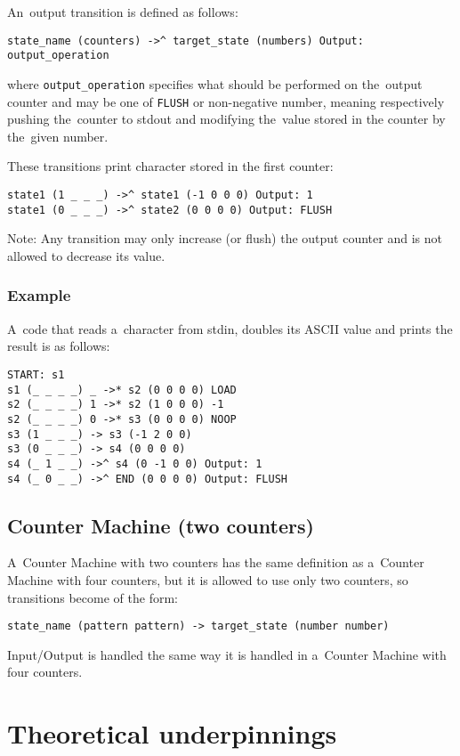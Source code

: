\documentclass[english,shortabstract,mgr]{iithesis}
\begin{document}
An~output transition is defined as follows:
\begin{verbatim}
state_name (counters) ->^ target_state (numbers) Output: output_operation
\end{verbatim}
%
where \texttt{output\_operation} specifies what should be performed on the~output
counter and may be one of \texttt{FLUSH} or non-negative number, meaning
respectively pushing the~counter to stdout and modifying the~value stored
in the counter by the~given number.

These transitions print character stored in the first counter:
\begin{verbatim}
state1 (1 _ _ _) ->^ state1 (-1 0 0 0) Output: 1
state1 (0 _ _ _) ->^ state2 (0 0 0 0) Output: FLUSH
\end{verbatim}

Note: Any transition may only increase (or flush) the output counter
and is not allowed to decrease its value.

\subsection{Example}

A~code that reads a~character from stdin, doubles its ASCII value and prints
the result is as follows:
\begin{verbatim}
START: s1
s1 (_ _ _ _) _ ->* s2 (0 0 0 0) LOAD
s2 (_ _ _ _) 1 ->* s2 (1 0 0 0) -1
s2 (_ _ _ _) 0 ->* s3 (0 0 0 0) NOOP
s3 (1 _ _ _) -> s3 (-1 2 0 0)
s3 (0 _ _ _) -> s4 (0 0 0 0)
s4 (_ 1 _ _) ->^ s4 (0 -1 0 0) Output: 1
s4 (_ 0 _ _) ->^ END (0 0 0 0) Output: FLUSH
\end{verbatim}

\section {Counter Machine (two counters)}

A~Counter Machine with two counters has the same definition as
a~Counter Machine with four counters, but it is allowed to use only
two counters, so transitions become of the form:

\begin{verbatim}
state_name (pattern pattern) -> target_state (number number)
\end{verbatim}

Input/Output is handled the same way it is handled in a~Counter Machine with four counters.


\chapter{Theoretical underpinnings}
\end{document}
